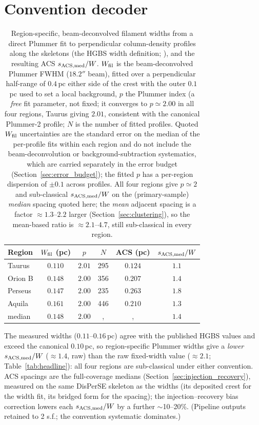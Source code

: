 \documentclass[usenatbib,twoside,twocolumn]{mnras}
\begin{document}
\section{Convention decoder}

\begin{table}
\caption{Region-specific, beam-deconvolved filament widths from a direct Plummer fit to perpendicular column-density profiles along the skeletons (the HGBS width definition; \citealt{Arzoumanian2019}), and the resulting ACS $s_{\rm ACS,med}/W$. $W_{\rm fil}$ is the beam-deconvolved Plummer FWHM ($18.2''$ beam), fitted over a perpendicular half-range of $0.4$\,pc either side of the crest with the outer $0.1$\,pc used to set a local background, $p$ the Plummer index (a \emph{free} fit parameter, not fixed; it converges to $p\simeq2.00$ in all four regions, Taurus giving $2.01$, consistent with the canonical Plummer-2 profile; $N$ is the number of fitted profiles. Quoted $W_{\rm fil}$ uncertainties are the standard error on the median of the per-profile fits within each region and do not include the beam-deconvolution or background-subtraction systematics, which are carried separately in the error budget (Section~\ref{sec:error_budget}); the fitted $p$ has a per-region dispersion of $\pm0.1$ across profiles. All four regions give $p\simeq2$ and sub-classical $s_{\rm ACS,med}/W$ on the (primary-sample) \emph{median} spacing quoted here; the \emph{mean} adjacent spacing is a factor $\approx1.3$--$2.2$ larger (Section~\ref{sec:clustering}), so the mean-based ratio is $\approx2.1$--$4.7$, still sub-classical in every region.}
\label{tab:widths}
\footnotesize
\setlength{\tabcolsep}{3pt}
\begin{tabular}{p{1.7cm}ccccc}
\toprule
Region & $W_{\rm fil}$ (pc) & $p$ & $N$ & ACS (pc) & $s_{\rm ACS,med}/W$ \\
\midrule
Taurus  & $0.110$ & $2.01$ & 295 & $0.124$ & $1.1$ \\
Orion B & $0.148$ & $2.00$ & 356 & $0.207$ & $1.4$ \\
Perseus & $0.147$ & $2.00$ & 235 & $0.263$ & $1.8$ \\
Aquila  & $0.161$ & $2.00$ & 446 & $0.210$ & $1.3$ \\
\midrule
median  & $0.148$ & $2.00$ &, &, & $1.4$ \\
\bottomrule
\end{tabular}
\par\vspace{2pt}
\footnotesize The measured widths ($0.11$--$0.16$\,pc) agree with the published HGBS values and exceed the canonical $0.10$\,pc, so region-specific Plummer widths give a \emph{lower} $s_{\rm ACS,med}/W$ ($\approx1.4$, raw) than the raw fixed-width value ($\approx2.1$; Table~\ref{tab:headline}): all four regions are sub-classical under either convention. ACS spacings are the full-coverage medians (Section~\ref{sec:injection_recovery}), measured on the same DisPerSE skeleton as the widths (its deposited crest for the width fit, its bridged form for the spacing); the injection--recovery bias correction lowers each $s_{\rm ACS,med}/W$ by a further $\sim$10--20\%. (Pipeline outputs retained to 2 s.f.; the convention systematic dominates.)
\end{table}
\label{sec:decoder}
\end{document}
